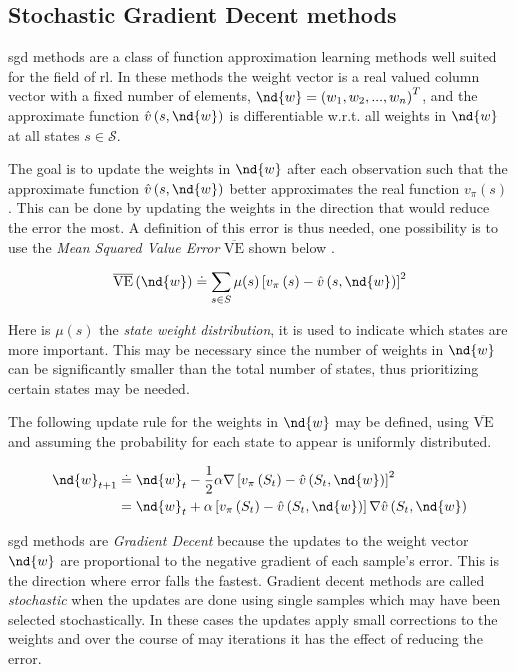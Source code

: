 \subsection{Stochastic Gradient Decent methods}
\label{sec:stochastic_gradient_decent_methods}
\acrfull{sgd} methods are a class of function approximation learning methods well suited for the field of \acrfull{rl}. In these methods the weight vector is a real valued column vector with a fixed number of elements, $\nd{w}=\left (w_1, w_2, ..., w_n \right )^T$, and the approximate function $\hat{v}\left(s, \nd{w}\right)$ is differentiable w.r.t. all weights in $\nd{w}$ at all states $s \in \mathcal{S}$.

The goal is to update the weights in $\nd{w}$ after each observation such that the approximate function $\hat{v}\left(s, \nd{w}\right)$ better approximates the real function $v_{\pi}\left(s\right)$. This can be done by updating the weights in the direction that would reduce the error the most. A definition of this error is thus needed, one possibility is to use the \emph{Mean Squared Value Error} $\overline{\text{VE}}$ shown below \cite{sutton2018reinforcement}.

\begin{equation}
    \overline{\text{VE}}\left(\nd{w}\right) \doteq  \sum_{s\in S} \mu(s) \left[v_{\pi}\left(s\right) - \hat{v}\left(s, \nd{w}\right) \right]^2
\end{equation}

Here is $\mu(s)$ the \emph{state weight distribution}, it is used to indicate which states are more important. This may be necessary since the number of weights in $\nd{w}$ can be significantly smaller than the total number of states, thus prioritizing certain states may be needed.

The following update rule for the weights in $\nd{w}$ may be defined, using $\overline{\text{VE}}$ and assuming the probability for each state to appear is uniformly distributed.

\begin{align}
  \nd{w}_{t+1} &\doteq \nd{w}_t - \frac{1}{2} \alpha \nabla \left[v_{\pi}\left(S_t\right) - \hat{v}\left(S_t, \nd{w}\right) \right]^2 \\
  &= \nd{w}_t + \alpha \left[v_{\pi}\left(S_t\right) - \hat{v}\left(S_t, \nd{w}\right) \right] \nabla \hat{v}\left(S_t, \nd{w}\right)
  \label{eq:w_update}
\end{align}

\acrshort{sgd} methods are \emph{Gradient Decent} because the updates to the weight vector $\nd{w}$ are proportional to the negative gradient of each sample's error. This is the direction where error falls the fastest. Gradient decent methods are called \emph{stochastic} when the updates are done using single samples which may have been selected stochastically. In these cases the updates apply small corrections to the weights and over the course of may iterations it has the effect of reducing the error.

